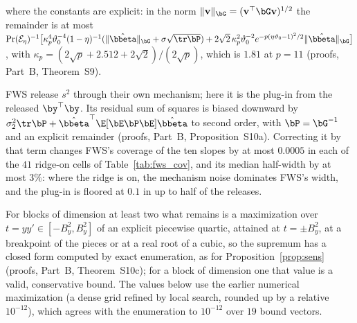 where the constants are explicit: in the norm $\|\mathbf v\|_{\bG} = (\mathbf v^\top\bG\mathbf v)^{1/2}$ the remainder is at most $\Pr(\mathcal E_\eta)^{-1}\bigl[\kappa_p^4\vartheta_0^{-4}(1 - \eta)^{-1}(\|\hat\bbeta\|_{\bG} + \sigma\sqrt{\tr\bP}) + 2\sqrt2\,\kappa_p^2\vartheta_0^{-2}e^{-p(\eta\vartheta_0 - 1)^2/2}\|\hat\bbeta\|_{\bG}\bigr]$, with $\kappa_p = (2\sqrt p + 2.512 + 2\sqrt2)/(2\sqrt p)$, which is $1.81$ at $p = 11$ (proofs, Part~B, Theorem~S9).

FWS release $s^2$ through their own mechanism; here it is the plug-in from the released $\by^\top\by$. Its residual sum of squares is biased downward by $\sigma_2^2\tr\bP + \hat\bbeta^\top\E[\bE\bP\bE]\hat\bbeta$ to second order, with $\bP = \bG^{-1}$ and an explicit remainder (proofs, Part~B, Proposition~S10a). Correcting it by that term changes FWS's coverage of the ten slopes by at most $0.0005$ in each of the $41$ ridge-on cells of Table~\ref{tab:fws_cov}, and its median half-width by at most $3\%$: where the ridge is on, the mechanism noise dominates FWS's width, and the plug-in is floored at $0.1$ in up to half of the releases.

For blocks of dimension at least two what remains is a maximization over $t = yy' \in [-B_y^2, B_y^2]$ of an explicit piecewise quartic, attained at $t = \pm B_y^2$, at a breakpoint of the pieces or at a real root of a cubic, so the supremum has a closed form computed by exact enumeration, as for Proposition~\ref{prop:sens} (proofs, Part~B, Theorem~S10c); for a block of dimension one that value is a valid, conservative bound. The values below use the earlier numerical maximization (a dense grid refined by local search, rounded up by a relative $10^{-12}$), which agrees with the enumeration to $10^{-12}$ over $19$ bound vectors.

